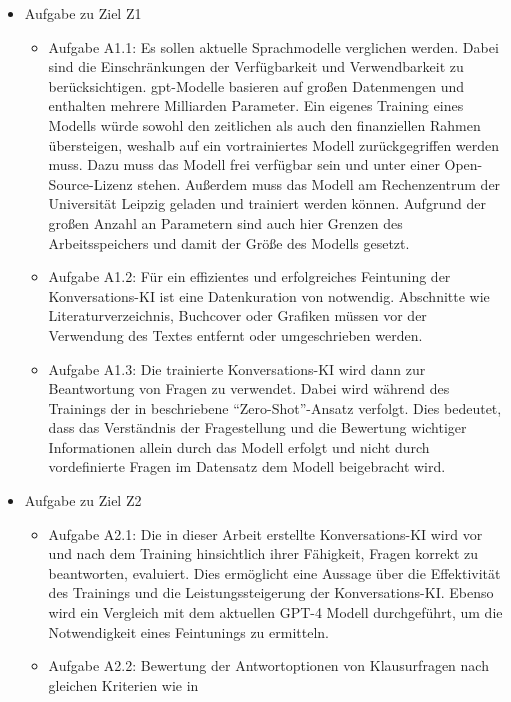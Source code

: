\begin{itemize}
  \item Aufgabe zu Ziel Z1
  \begin{itemize}
    \item Aufgabe A1.1: Es sollen aktuelle Sprachmodelle verglichen werden. Dabei sind die Einschränkungen der Verfügbarkeit und Verwendbarkeit zu berücksichtigen. 
    \ac{gpt}-Modelle basieren auf großen Datenmengen und enthalten mehrere Milliarden Parameter. 
    Ein eigenes Training eines Modells würde sowohl den zeitlichen als auch den finanziellen Rahmen übersteigen, weshalb auf ein vortrainiertes Modell zurückgegriffen werden muss. 
    Dazu muss das Modell frei verfügbar sein und unter einer Open-Source-Lizenz stehen. Außerdem muss das Modell am Rechenzentrum der Universität Leipzig geladen und trainiert werden können. Aufgrund der großen Anzahl an Parametern sind auch hier Grenzen des Arbeitsspeichers und damit der Größe des Modells gesetzt.
    \item Aufgabe A1.2: Für ein effizientes und erfolgreiches Feintuning der Konversations-KI ist eine Datenkuration von \citet{bb} notwendig. 
    Abschnitte wie Literaturverzeichnis, Buchcover oder Grafiken müssen vor der Verwendung des Textes entfernt oder umgeschrieben werden.
    \item Aufgabe A1.3: Die trainierte Konversations-KI wird dann zur Beantwortung von Fragen zu \citet{bb} verwendet. 
    Dabei wird während des Trainings der in \citet{gpt3} beschriebene \enquote{Zero-Shot}-Ansatz verfolgt.
    Dies bedeutet, dass das Verständnis der Fragestellung und die Bewertung wichtiger Informationen allein durch das Modell erfolgt und nicht durch vordefinierte Fragen im Datensatz dem Modell beigebracht wird.
  \end{itemize}
  \item Aufgabe zu Ziel Z2
  \begin{itemize}
    \item Aufgabe A2.1: Die in dieser Arbeit erstellte Konversations-KI wird vor und nach dem Training hinsichtlich ihrer Fähigkeit, Fragen korrekt zu beantworten, evaluiert.
    Dies ermöglicht eine Aussage über die Effektivität des Trainings und die Leistungssteigerung der Konversations-KI.\@
    Ebenso wird ein Vergleich mit dem aktuellen GPT-4 Modell \citep{gpt4} durchgeführt, um die Notwendigkeit eines Feintunings zu ermitteln.
    \item Aufgabe A2.2: Bewertung der Antwortoptionen von Klausurfragen nach gleichen Kriterien wie in \citet{chatgpt_qas}
  \end{itemize}
\end{itemize}

